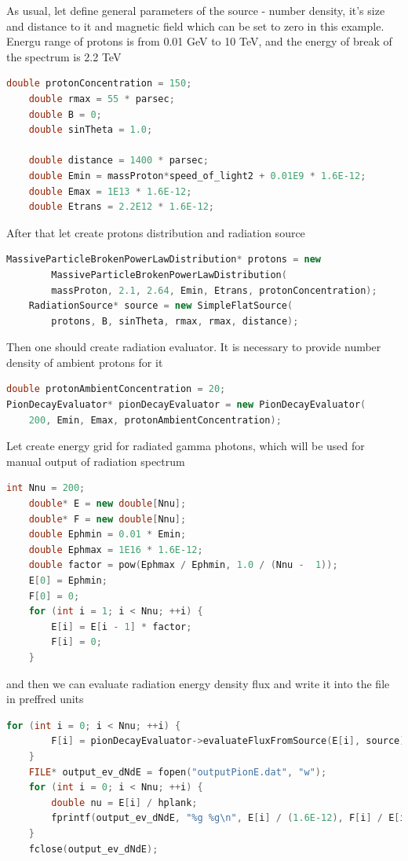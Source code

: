 As usual, let define general parameters of the source - number density, it's size and distance to it and magnetic field which can be set to zero in this example. Energu range of protons is from 0.01 GeV to 10 TeV, and the energy of break of the spectrum is 2.2 TeV
\begin{lstlisting}[language=c++]
	double protonConcentration = 150;
	double rmax = 55 * parsec;
	double B = 0;
	double sinTheta = 1.0;

	double distance = 1400 * parsec;
	double Emin = massProton*speed_of_light2 + 0.01E9 * 1.6E-12;
	double Emax = 1E13 * 1.6E-12;
	double Etrans = 2.2E12 * 1.6E-12;
\end{lstlisting}
After that let create protons distribution and radiation source
\begin{lstlisting}[language=c++]
	MassiveParticleBrokenPowerLawDistribution* protons = new 
		MassiveParticleBrokenPowerLawDistribution(
		massProton, 2.1, 2.64, Emin, Etrans, protonConcentration);
	RadiationSource* source = new SimpleFlatSource(
		protons, B, sinTheta, rmax, rmax, distance);
\end{lstlisting}
Then one should create radiation evaluator. It is necessary to provide number density of ambient protons for it
\begin{lstlisting}[language=c++]
double protonAmbientConcentration = 20;
PionDecayEvaluator* pionDecayEvaluator = new PionDecayEvaluator(
	200, Emin, Emax, protonAmbientConcentration);
\end{lstlisting}
Let create energy grid for radiated gamma photons, which will be used for manual output of radiation spectrum
\begin{lstlisting}[language=c++]
    int Nnu = 200;
    double* E = new double[Nnu];
    double* F = new double[Nnu];
    double Ephmin = 0.01 * Emin;
    double Ephmax = 1E16 * 1.6E-12;
    double factor = pow(Ephmax / Ephmin, 1.0 / (Nnu -  1));
    E[0] = Ephmin;
    F[0] = 0;
    for (int i = 1; i < Nnu; ++i) {
	    E[i] = E[i - 1] * factor;
    	F[i] = 0;
    }
\end{lstlisting}
and then we can evaluate radiation energy density flux and write it into the file in preffred units
\begin{lstlisting}[language=c++]
	for (int i = 0; i < Nnu; ++i) {
		F[i] = pionDecayEvaluator->evaluateFluxFromSource(E[i], source);
	}	
	FILE* output_ev_dNdE = fopen("outputPionE.dat", "w");
	for (int i = 0; i < Nnu; ++i) {
		double nu = E[i] / hplank;
		fprintf(output_ev_dNdE, "%g %g\n", E[i] / (1.6E-12), F[i] / E[i]);
	}
	fclose(output_ev_dNdE);
\end{lstlisting}
